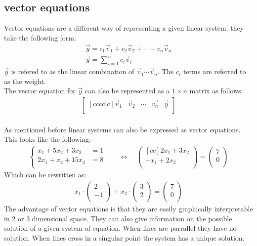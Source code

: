 \documentclass[11pt, a4paper]{article}
\begin{document}
\subsection{vector equations}
Vector equations are a different way of representing a given linear system. they take the following form:
\begin{gather*}
    \vec{y} = c_1\vec{v}_1 + c_2\vec{v}_2 + \cdots + c_n\vec{v}_n\\
    \vec{y} = \sum_{i=1}^{n} c_i\vec{v}_i
\end{gather*}
$\vec{y}$ is refered to as the linear combination of $\vec{v}_1 \cdots \vec{v}_n$. The $c_i$ terms are referred
to as the weight.\\
The vector equation for $\vec{y}$ can also be represented as a $1\times n$ matrix as follows:
\begin{align*}
    \begin{bmatrix}[cccc|c]
        \vec{v}_1 & \vec{v}_2 & \cdots & \vec{v_n} & \vec{y}\\
    \end{bmatrix}
\end{align*}
\\
As mentioned before linear systems can also be expressed as vector equations.
This looks like the following:
\begin{align*}
    \begin{cases} 
        x_1 + 5x_2 + 3x_3 &= 1 \\
        2x_1 + x_2 + 15x_3 &= 8 \\
        \end{cases}
    \quad &\Leftrightarrow \quad
    \begin{pmatrix}[cc]
        2x_1 + 3x_2 \\
        -x_1 + 2x_2 \\
    \end{pmatrix}
        =
    \begin{pmatrix}
        7\\
        0\\
    \end{pmatrix}
\end{align*}
Which can be rewritten as:
\begin{align*}
    x_1 \cdot
    \begin{pmatrix}
        2\\
        -1\\
    \end{pmatrix}
    + x_2 \cdot
    \begin{pmatrix}
        3\\
        2\\
    \end{pmatrix}
    =
    \begin{pmatrix}
        7\\
        0\\
    \end{pmatrix}
\end{align*}
The advantage of vector equations is that they are easily graphically interpretable in 2 or 3 dimensional space.
They can also give information on the possible solution of a given system of equation. When lines
are parrallel they have no solution. When lines cross in a singular point the system has a unique solution.
\end{document}
